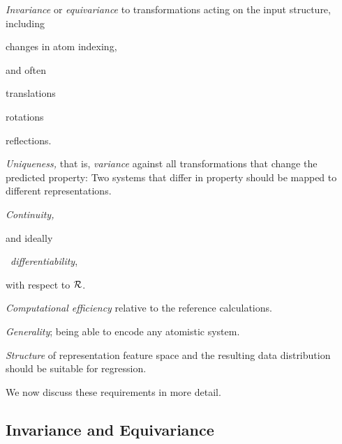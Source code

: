 \begin{romanenum}
	\item \emph{Invariance} or \emph{equivariance} to transformations acting on the input structure, including \label{req:Invariance}%
		\begin{romanenum*}
			\item \label{req:InvIndexing} changes in atom indexing,
		\end{romanenum*}
		and often 
		\begin{romanenum*}[resume]
			\item \label{req:InvTranslation} translations
			\item \label{req:InvRotation} rotations 
			\item \label{req:InvReflection} reflections. %
		\end{romanenum*} 
		
	\item \emph{Uniqueness,} \label{req:Uniqueness}
		that is, \emph{variance} against all transformations that change the predicted property:
		Two systems that differ in property should be mapped to different representations.

	\item%
		\begin{romanenum*} \item \label{req:Continuity} \emph{Continuity,} \end{romanenum*} 
		and ideally \begin{romanenum*}[resume] \item \ \emph{differentiability}, \end{romanenum*}
		with respect to $\mathcal{R}$.
		
	\item \emph{Computational efficiency} relative to the reference calculations. \label{req:Runtime}
	
	\item \emph{Generality}; being able to encode any atomistic system.

	\item \emph{Structure}\label{req:Structure}
		of representation feature space and the resulting data distribution should be suitable for regression.
\end{romanenum}

\noindent
We now discuss these requirements in more detail.


\subsection{Invariance and Equivariance}
\label{ssec:repsb_invariance}

